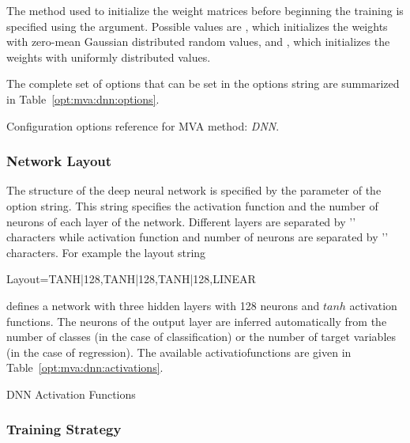 The method used to initialize the weight matrices before beginning the
training is specified using the 
argument. Possible values are , which initializes the
weights with zero-mean Gaussian distributed random values, and
, which initializes the weights with uniformly
distributed values.

The complete set of options that can be set in the options string are summarized in
Table~\ref{opt:mva:dnn:options}.
\begin{option}[h]

\caption[.]{\optionCaptionSize
     Configuration options reference for MVA method: {\em DNN}.
}
\label{opt:mva:dnn:options}
\end{option}

\subsubsection{Network Layout}
\label{sec:dnn:layout}

The structure of the deep neural network is specified by the
 parameter of the option string. This string specifies
the activation function and the number of neurons of each layer of the
network. Different layers are separated by '\code{,}' characters while
activation function and number of neurons are separated by '\code{|}'
characters. For example the layout string

\begin{tmvacode}
  Layout=TANH|128,TANH|128,TANH|128,LINEAR
\end{tmvacode}

defines a network with three hidden layers with 128 neurons and
$tanh$ activation functions. The neurons of the output layer are
inferred automatically from the number of classes (in the case of
classification) or the number of target variables (in the case of
regression). The available activatio\n functions are given in
Table~\ref{opt:mva:dnn:activations}.

\begin{option}[h]

\caption[.]{\optionCaptionSize
     DNN Activation Functions
}
\label{opt:mva:dnn:activations}
\end{option}

\subsubsection{Training Strategy}
\label{sec:dnn:training}

